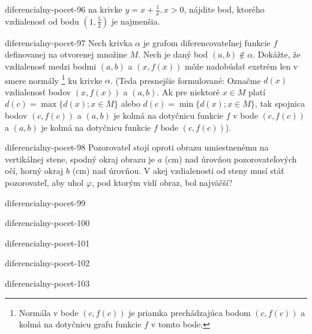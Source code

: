 \begin{defproblem}{diferencialny-pocet-96}
na krivke $y=x+\frac{1}{x},x>0$, nájdite bod, ktorého vzdialenosť od bodu $(1,\frac{5}{2})$ je najmenšia.
\end{defproblem}

\begin{defproblem}{diferencialny-pocet-97}
Nech krivka $\alpha$ je grafom diferencovateľnej funkcie $f$ definovanej na otvorenej množine $M$. Nech je daný bod $(a,b)\notin \alpha$. Dokážte, že vzdialenosť medzi bodmi $(a,b)$ a $(x,f(x))$ môže nadobúdať exstrém len v smere normály \footnote{Normála v bode $(c,f(c))$ je priamka prechádzajúca bodom $(c,f(c))$ a kolmá na dotyčnicu grafu funkcie $f$ v tomto bode.} ku krivke $\alpha$. (Teda presnejšie formulované: Označme $d(x)$ vzdialenosť bodov $(x,f(x))$ a $(a,b)$. Ak pre niektoré $x\in M$ platí $d(c)=\max \{d(x);x\in M\}$ alebo $d(c)=\min \{d(x);x\in M\}$, tak spojnica bodov $(c,f(c))$ a $(a,b)$ je kolmá na dotyčnicu funkcie $f$ v bode $(c,f(c))$ a $(a,b)$ je kolmá na dotyčnicu funkcie $f$  bode $(c,f(c))$).
\end{defproblem}

\begin{defproblem}{diferencialny-pocet-98}
Pozorovateľ stojí oproti obrazu umiestnenému na vertikálnej stene, spodný okraj obrazu je $a$ (cm) nad úrovňou pozorovateľových očí, horný okraj $b$ (cm) nad úrovňou. V akej vzdialenosti od steny musí stáť pozorovateľ, aby uhol $\varphi$, pod ktorým vidí obraz, bol najväčší?
\end{defproblem}

\begin{defproblem}{diferencialny-pocet-99}

\end{defproblem}

\begin{defproblem}{diferencialny-pocet-100}

\end{defproblem}

\begin{defproblem}{diferencialny-pocet-101}

\end{defproblem}

\begin{defproblem}{diferencialny-pocet-102}

\end{defproblem}

\begin{defproblem}{diferencialny-pocet-103}

\end{defproblem}

